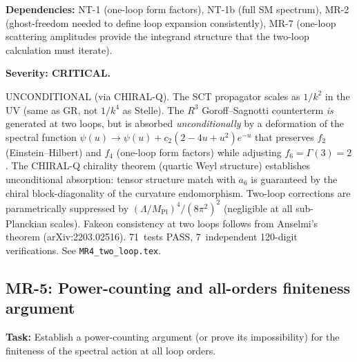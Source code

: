 \documentclass[12pt,a4paper]{article}
\newcommand{\task}[1]{\noindent\textbf{Task:} #1\par}
\newcommand{\deps}[1]{\noindent\textbf{Dependencies:} #1\par}
\begin{document}
\deps{NT-1 (one-loop form factors), NT-1b (full SM spectrum), MR-2
(ghost-freedom needed to define loop expansion consistently),
MR-7 (one-loop scattering amplitudes provide the integrand structure
that the two-loop calculation must iterate).}

\textbf{Severity: CRITICAL.}

\textcolor{proven}{UNCONDITIONAL (via CHIRAL-Q).}
The SCT propagator scales as $1/k^2$ in the UV (same as GR, not $1/k^4$ as Stelle).
The $R^3$ Goroff--Sagnotti counterterm \emph{is} generated at two loops, but is
absorbed \emph{unconditionally} by a deformation of the spectral function
$\psi(u) \to \psi(u) + c_2(2-4u+u^2)e^{-u}$
that preserves $f_2$ (Einstein--Hilbert) and $f_4$ (one-loop form factors) while adjusting
$f_6 = \Gamma(3) = 2$.  The CHIRAL-Q chirality theorem (quartic Weyl structure)
establishes unconditional absorption: tensor structure match with $a_6$ is guaranteed
by the chiral block-diagonality of the curvature endomorphism.
Two-loop corrections are parametrically suppressed by $(\Lambda/M_{\text{Pl}})^4/(8\pi^2)^2$
(negligible at all sub-Planckian scales).
Fakeon consistency at two loops follows from Anselmi's theorem (arXiv:2203.02516).
71~tests PASS, 7~independent 120-digit verifications.
See \texttt{MR4\_two\_loop.tex}.

\subsection{MR-5: Power-counting and all-orders finiteness argument}
\label{task:MR5}

\task{Establish a power-counting argument (or prove its impossibility)
for the finiteness of the spectral action at all loop orders.}
\end{document}
